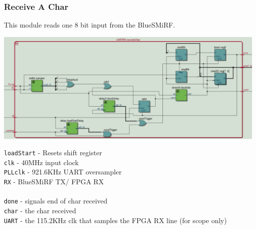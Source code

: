 \documentclass[12pt]{article}
\begin{document}
\subsubsection{Receive A Char}
This module reads one 8 bit input from the BlueSMiRF.
\begin{center}
\includegraphics[width=\textwidth]{receiveChar}
\end{center}
\verb.loadStart. - Resets shift register
\\ \verb.clk. - 40MHz input clock
\\ \verb.PLLclk. - 921.6KHz UART oversampler
\\ \verb.RX. - BlueSMiRF TX/ FPGA RX
\\\\ \verb.done. - signals end of char received
\\ \verb.char. - the char received
\\ \verb.UART. - the 115.2KHz clk that samples the FPGA RX line (for scope only)



\end{document}

